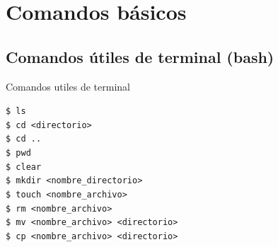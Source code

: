 \documentclass{beamer}
\begin{document}
 
 
  

\section{Comandos básicos}

\subsection {Comandos útiles de terminal (bash)}

\begin{frame}[containsverbatim]{Comandos utiles de terminal}

  \begin{block}{}
    \texttt{\$ ls \\
    \$ cd <directorio>  \\ 
    \$ cd .. \\ 
    \$ pwd \\
    \$ clear  \\ 
    \$ mkdir <nombre\_directorio> \\ 
    \$ touch <nombre\_archivo>\\ 
    \$ rm <nombre\_archivo> \\ 
    \$ mv <nombre\_archivo> <directorio> \\
    \$ cp <nombre\_archivo> <directorio>}
  \end{block}

\end{frame}
\end{document}
